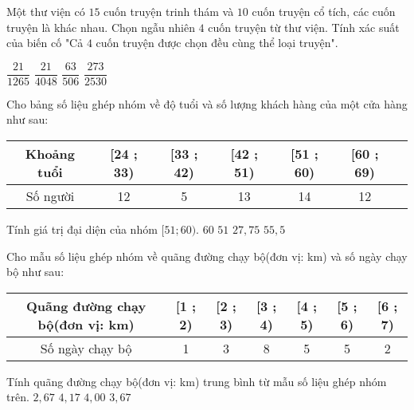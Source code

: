 \documentclass[12pt,a4paper]{article}
\begin{document}
\begin{ex}
 Một thư viện có ${15}$ cuốn truyện trinh thám và ${10}$ cuốn truyện cổ tích, các cuốn truyện là khác nhau. Chọn ngẫu nhiên ${4}$ cuốn truyện từ thư viện. Tính xác suất của biến cố "Cả ${4}$ cuốn truyện được chọn đều cùng thể loại truyện".
 
\choice
{ ${\dfrac{21}{1265}}$ }
   { ${\dfrac{21}{4048}}$ }
     { \True ${\dfrac{63}{506}}$ }
    { ${\dfrac{273}{2530}}$ }
\end{ex}

\begin{ex}
 Cho bảng số liệu ghép nhóm về độ tuổi và số lượng khách hàng của một cửa hàng như sau:
 
\begin{center}\begin{tabular}{|c|c|c|c|c|c|c|}
        \hline
        Khoảng tuổi   & [24 ; 33) & [33 ; 42) & [42 ; 51) & [51 ; 60) & [60 ; 69)\\  
        \hline 
        Số người & 12 & 5 & 13 & 14 & 12 \\ 
        \hline 
    \end{tabular}
\end{center}
 Tính giá trị đại diện của nhóm $[51;60)$.
\choice
{ $ {60}$ }
   { $ {51}$ }
     { $ {27,75}$ }
    { \True ${55,5}$ }
\end{ex}

\begin{ex}
 Cho mẫu số liệu ghép nhóm về quãng đường chạy bộ(đơn vị: km) và số ngày chạy bộ như sau:
 
\begin{center}\begin{tabular}{|c|c|c|c|c|c|c|}
        \hline
        Quãng đường chạy bộ(đơn vị: km)   & [1 ; 2) & [2 ; 3) & [3 ; 4) & [4 ; 5) & [5 ; 6) & [6 ; 7)\\  
        \hline 
        Số ngày chạy bộ & 1 & 3 & 8 & 5 & 5 & 2 \\ 
        \hline 
    \end{tabular}
\end{center}
 Tính quãng đường chạy bộ(đơn vị: km) trung bình từ mẫu số liệu ghép nhóm trên.
\choice
{ $ {2,67}$ }
   { \True ${4,17}$ }
     { $ {4,00}$ }
    { $ {3,67}$ }
\end{ex}
\end{document}
